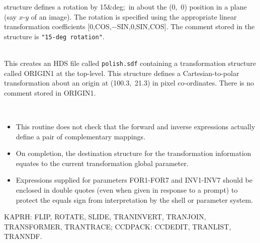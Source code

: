 \documentclass[twoside,11pt]{article}
\newcommand{\dgs}{\hbox{$^\circ$}}
\renewcommand{\dgs}{{\rawhtml &deg;}}
\newcommand{\sstexamplesubsection}[2]{\sloppy \item{\ssttt #1} \mbox{} \\ #2 }
\newcommand{\sstnotes}[1]{\pagebreak[3] \item[Notes:] \mbox{} \\[1.3ex] #1}
\newcommand{\sstdiytopic}[2]{\goodbreak \item[{\hspace{-0.35em}#1\hspace{-0.35em}:}] \mbox{} \\[1.3ex] #2}
\newenvironment{sstitemize}{%
  \vspace{-4.3ex}\begin{itemize}}{\end{itemize}}
\newcommand{\sstitemlist}[1]{
  \mbox{} \\
  \vspace{-3.5ex}
  \begin{sstitemize}
     #1
  \end{sstitemize}
}
\newcommand{\sstitem}{\item}
\newcommand{\ssttt}{\tt}
\renewcommand{\sstexamplesubsection}[2]{\item[{\ssttt #1}] \\ #2}
\renewcommand{\sstnotes}[1]{\item[Notes:]
      \begin{description}
         #1
      \end{description}
   }
\renewcommand{\sstdiytopic}[2]{\item[{#1}]
      \begin{description}
         #2
      \end{description}
   }
\newcommand{\sstitemlist}[1]{
      \begin{itemize}
         #1
      \end{itemize}
   }
\begin{document}
{{{         structure defines a rotation by 15\dgs\ in about the (0,~0)
         position in a plane (say $x$-$y$ of an image).  The rotation
         is specified using the appropriate linear transformation
         coefficients [0,COS,$-$SIN,0,SIN,COS].  The comment stored in the
         structure is {\tt "15-deg rotation"}.
      }
      \sstexamplesubsection{
         tranmake polish.origin1 trtype=p tr=[100.0,21.3] $\backslash$
      }{
         This creates an HDS file called {\tt polish.sdf} containing a
         transformation structure called ORIGIN1 at the top-level.
         This structure defines a Cartesian-to-polar transformation
         about an origin at (100.3,~21.3) in pixel co-ordinates.
         There is no comment stored in ORIGIN1.
      }
   }
   \sstnotes{
      \sstitemlist{

         \sstitem
         This routine does not check that the forward and inverse
         expressions actually define a pair of complementary mappings.

         \sstitem
         On completion, the destination structure for the
         transformation information equates to the current transformation
         global parameter.

         \sstitem
         Expressions supplied for parameters FOR1-FOR7 and INV1-INV7 
         should be enclosed in double quotes (even when given in response 
         to a prompt) to protect the equals sign from interpretation by 
         the shell or parameter system.

      }
   }
   \sstdiytopic{
      Related Applications
   }{
      KAPRH: FLIP, ROTATE, SLIDE, TRANINVERT, TRANJOIN, TRANSFORMER, \linebreak
      TRANTRACE; CCDPACK: CCDEDIT, TRANLIST, TRANNDF.
   }
}
\end{document}

